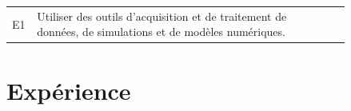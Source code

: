 \documentclass[12pt,a4paper,notitlepage]{article}
\begin{document}
\begin{flushleft}
\begin{tabular}{| m{0.03\linewidth} | m{0.75\linewidth} || m{0.015\linewidth} | m{0.015\linewidth} | m{0.015\linewidth} | m{0.015\linewidth} || }
	E1 & \footnotesize{Utiliser des outils d'acquisition et de traitement de données, de simulations et de modèles numériques.} & & & & \cr \hline
	\hline
\end{tabular}
\end{flushleft}

\section{Expérience}
\end{document}
